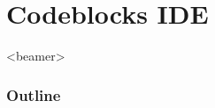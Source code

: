 %
%

\section{Codeblocks IDE}
\label{sec:cb}
\begin{frame}<beamer>
    \frametitle{Outline}
    \tableofcontents[currentsection]
\end{frame}

